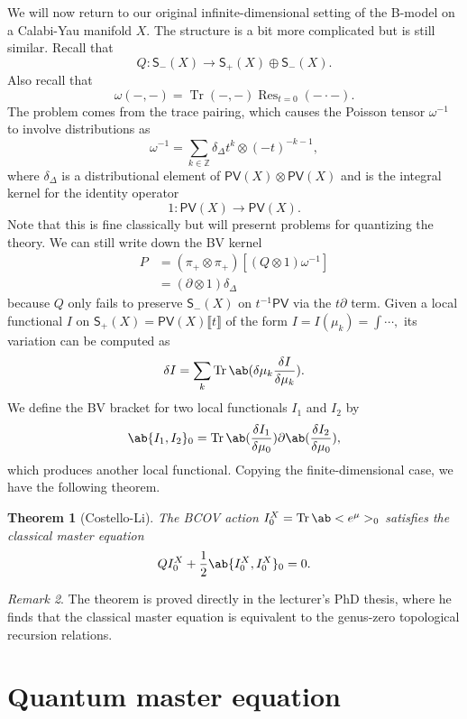 \documentclass{amsart}
\newtheorem{thm}{Theorem}[section]
\theoremstyle{definition}
\theoremstyle{remark}
\newtheorem{rmk}[thm]{Remark}
\theoremstyle{plain}
\theoremstyle{definition}
\theoremstyle{remark}
\newcommand{\Z}{\mathbb{Z}}
\newcommand{\on}[1]{\operatorname{#1}}
\newcommand{\ms}[1]{\mathsf{#1}}
\newcommand{\1}{\mathbf{1}}
\newcommand{\2}{\mathbf{2}}
\newcommand{\3}{\mathbf{3}}
\newcommand{\ps}[1]{\lBrack #1 \rBrack}
\begin{document}
We will now return to our original infinite-dimensional setting of the B-model on a Calabi-Yau manifold \(X\). The structure is a bit more complicated but is still similar. Recall that
\[ Q \colon \ms{S}_-(X) \to \ms{S}_+(X) \oplus \ms{S}_-(X). \]
Also recall that
\[ \omega(-,-) = \on{Tr}(-,-) \on{Res}_{t = 0} (- \cdot -). \]
The problem comes from the trace pairing, which causes the Poisson tensor \(\omega^{-1}\) to involve distributions as
\[ \omega^{-1} = \sum_{k \in \Z} \delta_{\Delta} t^k \otimes (-t)^{-k-1}, \]
where \(\delta_{\Delta}\) is a distributional element of \(\ms{PV}(X) \otimes \ms{PV}(X)\) and is the integral kernel for the identity operator
\[ 1 \colon \ms{PV}(X) \to \ms{PV}(X). \]
Note that this is fine classically but will presernt problems for quantizing the theory. We can still write down the BV kernel
\begin{align*}
    P &= (\pi_+ \otimes \pi_+) [(Q \otimes 1) \omega^{-1}] \\
    &= (\partial \otimes 1) \delta_{\Delta}
\end{align*}
because \(Q\) only fails to preserve \(\ms{S}_-(X)\) on \(t^{-1} \ms{PV}\) via the \(t \partial\) term. Given a local functional \(I\) on \(\ms{S}_+(X) = \ms{PV}(X) \ps{t}\) of the form \(I = I(\mu_k) = \int \cdots,\) its variation can be computed as
\begin{align*}
    \delta I = \sum_k \on{Tr} \ab(\delta \mu_k \fdv{I}{\mu_k}).
\end{align*}
We define the BV bracket for two local functionals \(I_1\) and \(I_2\) by
\[ \ab\{ I_1, I_2 \}_0 = \on{Tr} \ab(\fdv{I_1}{\mu_0}) \partial \ab(\fdv{I_2}{\mu_0}), \]
which produces another local functional. Copying the finite-dimensional case, we have the following theorem.

\begin{thm}[Costello-Li]
    The BCOV action \(I_0^X = \on{Tr}\ab<e^{\mu}>_0\) satisfies the \textit{classical master equation}
    \[ Q I_0^X + \frac{1}{2} \ab\{ I_0^X, I_0^X \}_0 = 0. \]
\end{thm}

\begin{rmk}
    The theorem is proved directly in the lecturer's PhD thesis, where he finds that the classical master equation is equivalent to the genus-zero topological recursion relations. 
\end{rmk}

\section{Quantum master equation}%
\label{sec:Quantum master equation}
\end{document}
